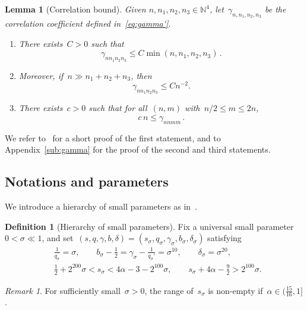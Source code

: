 \documentclass[11pt,reqno,english]{amsart}
\numberwithin{equation}{section}
\theoremstyle{plain}
\newtheorem{lemma}[theorem]{Lemma}
\theoremstyle{definition}
\newtheorem{definition}[theorem]{Definition}
\theoremstyle{remark}
\newtheorem{remark}[theorem]{Remark}
\newcommand{\N}{\mathbb{N}}
\begin{document}
\begin{lemma}[Correlation bound]\label{lem:gamma}
	Given $n,n_{1},n_{2},n_{3}\in\N^{4}$, let~$\gamma_{n,n_{1},n_{2},n_{3}}$ be the correlation coefficient defined in~\eqref{eq:gamma'}.
	\begin{enumerate}
		\item There exists~$C>0$ such that
		\begin{equation}
			\label{eq:gamma'}
			\gamma_{nn_{1}n_{2}n_{3}}
			\leq C
			\min(n,n_{1},n_{2},n_{3})\,.
		\end{equation}
		\item Moreover, if~$n\gg n_1+n_2+n_3$, then
		\begin{equation}
			\label{eq:gamma3}
			\gamma_{nn_1n_2n_3}\leq C n^{-2}.
		\end{equation}
		\item There exists~$c>0$ such that for all~$(n,m)$ with~$n/2\leq m \leq 2n$,
		\begin{equation}
			\label{eq:gamma2}
			c\,n \leq \gamma_{nnmm}\,.
		\end{equation}
	\end{enumerate}
\end{lemma}
We refer to~\cite{BB14} for a short proof of the first statement, and to Appendix~\ref{sub:gamma} for the proof of the second and third statements.


\subsection{Notations and parameters}

We introduce a hierarchy of small parameters as in~\cite{BCST24}.
\begin{definition}[Hierarchy of small parameters]\label{hierarchy}
	Fix a universal small parameter~$0<\sigma\ll 1$, and set~$(s,q,\gamma,b,\delta)=(s_{\sigma},q_{\sigma},\gamma_{\sigma},b_{\sigma},\delta_{\sigma})$ satisfying
	\begin{align*}
		&\frac{1}{q_{\sigma}}=\sigma, \qquad
		b_{\sigma}-\frac{1}{2}=\gamma_{\sigma}-\frac{1}{q_{\sigma}'}=\sigma^{10},\qquad
		\delta_{\sigma}=\sigma^{20},\\
		&\frac{1}{2}+2^{200}\sigma<s_{\sigma}<4\alpha-3-2^{100}\sigma,\qquad
		s_{\sigma}+4\alpha-\frac{9}{2}>2^{100}\sigma.
	\end{align*}
\end{definition}
\begin{remark}\label{rem:hierarchy}
	For sufficiently small~$\sigma>0$, the range of~$s_{\sigma}$ is non-empty if~$\alpha\in(\frac{15}{16},1]$.
\end{remark}
\end{document}
